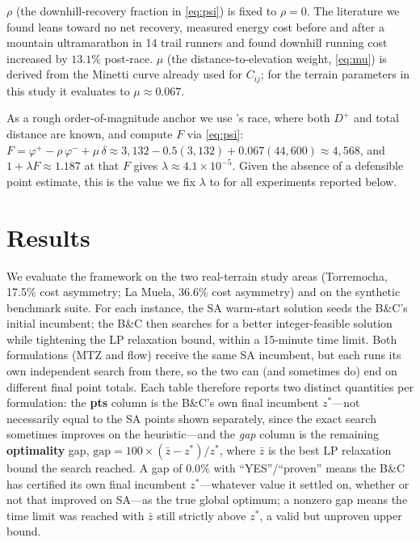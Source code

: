 \documentclass[11pt,a4paper]{article}
\begin{document}
$\rho$ (the downhill-recovery fraction in \cref{eq:psi}) is fixed to $\rho = 0$. The literature we found leans toward no net recovery, \citet{vernillo2015} measured energy cost before and after a mountain ultramarathon in 14 trail runners and found downhill running cost increased by $13.1\%$ post-race.
$\mu$ (the distance-to-elevation weight, \cref{eq:mu}) is derived from the Minetti curve already used for $C_{ij}$; for the terrain parameters in this study it evaluates to $\mu \approx 0.067$.

As a rough order-of-magnitude anchor we use \citeauthor{jaencarrillo2025}'s race, where both $D^+$ and total distance are known, and compute $F$ via \cref{eq:psi}: $F = \varphi^+ - \rho\,\varphi^- + \mu\,\delta \approx 3{,}132 - 0.5(3{,}132) + 0.067(44{,}600) \approx 4{,}568$, and $1+\lambda F \approx 1.187$ at that $F$ gives $\lambda \approx 4.1 \times 10^{-5}$.
Given the absence of a defensible point estimate, this is the value we fix $\lambda$ to for all experiments reported below.
\section{Results}
\label{sec:results}

We evaluate the framework on the two real-terrain study areas (Torremocha, 17.5\% cost asymmetry; La Muela, 36.6\% cost asymmetry) and on the synthetic benchmark suite.
For each instance, the SA warm-start solution seeds the B\&C's initial incumbent; the B\&C then searches for a better integer-feasible solution while tightening the LP relaxation bound, within a 15-minute time limit.
Both formulations (MTZ and flow) receive the same SA incumbent, but each runs its own independent search from there, so the two can (and sometimes do) end on different final point totals.
Each table therefore reports two distinct quantities per formulation: the \textbf{pts} column is the B\&C's own final incumbent $z^*$---not necessarily equal to the SA points shown separately, since the exact search sometimes improves on the heuristic---and the \emph{gap} column is the remaining \textbf{optimality} gap, $\text{gap} = 100 \times (\bar{z} - z^*) / z^*$, where $\bar{z}$ is the best LP relaxation bound the search reached.
A gap of $0.0\%$ with ``YES''/``proven'' means the B\&C has certified its own final incumbent $z^*$---whatever value it settled on, whether or not that improved on SA---as the true global optimum; a nonzero gap means the time limit was reached with $\bar{z}$ still strictly above $z^*$, a valid but unproven upper bound.
\end{document}
